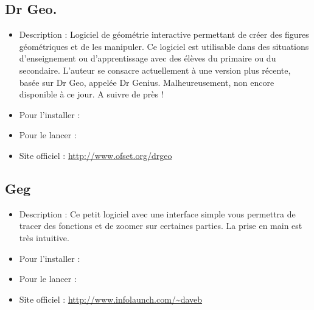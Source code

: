 \subsection{Dr Geo.}
\begin{itemize}
\begingroup
{}
\item Description : Logiciel de géométrie interactive permettant de créer des figures géométriques et de les manipuler. Ce logiciel est utilisable dans des situations d'enseignement ou d'apprentissage avec des élèves du primaire ou du secondaire. L'auteur se consacre actuellement à une version plus récente, basée sur Dr Geo, appelée Dr Genius. Malheureusement, non encore disponible à ce jour. A suivre de près !{\par}
\item Pour l'installer : 
\item Pour le lancer : 
\item Site officiel : \url{http://www.ofset.org/drgeo}{\par}
\endgroup
\end{itemize}
\subsection{Geg}
\begin{itemize}
\begingroup
{}
\item Description : Ce petit logiciel avec une interface simple vous permettra de tracer des fonctions et de zoomer sur certaines parties. La prise en main est très intuitive.{\par}
\item Pour l'installer : 
\item Pour le lancer : 
\item Site officiel : \url{http://www.infolaunch.com/~daveb}{\par}
\endgroup
\end{itemize}
